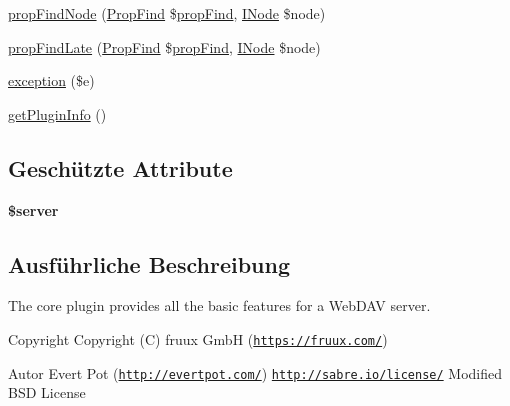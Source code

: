 \begin{DoxyCompactItemize}
\item 
\mbox{\hyperlink{class_sabre_1_1_d_a_v_1_1_core_plugin_ac26a8b7d2112d53e6d62669b0e1a28c9}{prop\+Find\+Node}} (\mbox{\hyperlink{class_sabre_1_1_d_a_v_1_1_prop_find}{Prop\+Find}} \$\mbox{\hyperlink{class_sabre_1_1_d_a_v_1_1_core_plugin_abdbc8acfaf7175d191847aab4f601c34}{prop\+Find}}, \mbox{\hyperlink{interface_sabre_1_1_d_a_v_1_1_i_node}{I\+Node}} \$node)
\item 
\mbox{\hyperlink{class_sabre_1_1_d_a_v_1_1_core_plugin_a0de20d42199dec3b53217e7e9ebb4355}{prop\+Find\+Late}} (\mbox{\hyperlink{class_sabre_1_1_d_a_v_1_1_prop_find}{Prop\+Find}} \$\mbox{\hyperlink{class_sabre_1_1_d_a_v_1_1_core_plugin_abdbc8acfaf7175d191847aab4f601c34}{prop\+Find}}, \mbox{\hyperlink{interface_sabre_1_1_d_a_v_1_1_i_node}{I\+Node}} \$node)
\item 
\mbox{\hyperlink{class_sabre_1_1_d_a_v_1_1_core_plugin_aaf2b1b6a32575b437519d0214d301e1f}{exception}} (\$e)
\item 
\mbox{\hyperlink{class_sabre_1_1_d_a_v_1_1_core_plugin_a2161a6cfdfed86d4dd711a959131722d}{get\+Plugin\+Info}} ()
\end{DoxyCompactItemize}
\subsection*{Geschützte Attribute}
\begin{DoxyCompactItemize}
\item 
\mbox{\label{class_sabre_1_1_d_a_v_1_1_core_plugin_a19cc9770c828c61a92e9a5649b51a276}} 
{\bfseries \$server}
\end{DoxyCompactItemize}


\subsection{Ausführliche Beschreibung}
The core plugin provides all the basic features for a Web\+D\+AV server.

\begin{DoxyCopyright}{Copyright}
Copyright (C) fruux GmbH (\href{https://fruux.com/}{\tt https\+://fruux.\+com/}) 
\end{DoxyCopyright}
\begin{DoxyAuthor}{Autor}
Evert Pot (\href{http://evertpot.com/}{\tt http\+://evertpot.\+com/})  \href{http://sabre.io/license/}{\tt http\+://sabre.\+io/license/} Modified B\+SD License 
\end{DoxyAuthor}


